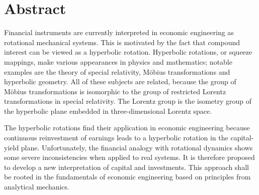 \chapter*{Abstract}%
Financial instruments are currently interpreted in economic engineering as rotational mechanical systems. This is motivated by the fact that compound interest can be viewed as a hyperbolic rotation. Hyperbolic rotations, or squeeze mappings, make various appearances in physics and mathematics; notable examples are the theory of special relativity, Möbius transformations and hyperbolic geometry. All of these subjects are related, because the group of Möbius transformations is isomorphic to the group of restricted Lorentz transformations in special relativity. The Lorentz group is the isometry group of the hyperbolic plane embedded in three-dimensional Lorentz space. 

The hyperbolic rotations find their application in economic engineering because continuous reinvestment of earnings leads to a hyperbolic rotation in the capital-yield plane. Unfortunately, the financial analogy with rotational dynamics shows some severe inconsistencies when applied to real systems. It is therefore proposed to develop a new interpretation of capital and investments. This approach shall be rooted in the fundamentals of economic engineering based on principles from analytical mechanics.




